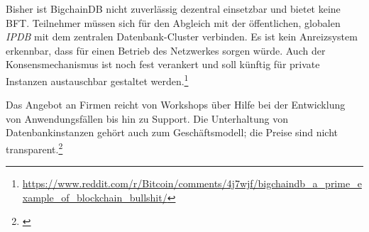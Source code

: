 Bisher ist BigchainDB nicht zuverlässig dezentral einsetzbar und bietet keine \gls{BFT}.
Teilnehmer müssen sich für den Abgleich mit der öffentlichen, globalen \emph{IPDB} mit dem zentralen Datenbank-Cluster verbinden.
Es ist kein Anreizsystem erkennbar, dass für einen Betrieb des Netzwerkes sorgen würde.
Auch der Konsensmechanismus ist noch fest verankert und soll künftig für private Instanzen austauschbar gestaltet werden.\footnote{\url{https://www.reddit.com/r/Bitcoin/comments/4j7wjf/bigchaindb_a_prime_example_of_blockchain_bullshit/}}

Das Angebot an Firmen reicht von Workshops über Hilfe bei der Entwicklung von Anwendungsfällen bis hin zu Support.
Die Unterhaltung von Datenbankinstanzen gehört auch zum Geschäftsmodell; die Preise sind nicht transparent.\footnote{\cite{w:bigchaindb-enterprise}}




